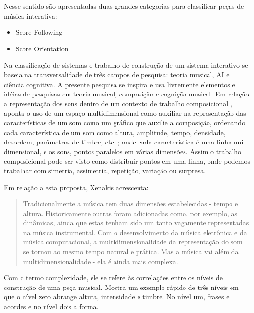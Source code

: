 \documentclass[draft]{ppgmus}
\begin{document}
Nesse sentido são apresentadas duas grandes categorias para classificar peças
de música interativa:

\begin{itemize}
 \item Score Following
  \item Score Orientation
\end{itemize}








Na classificação de sistemas \cite{rowe93:interactive} o trabalho de construção de um sistema interativo se
baseia na transversalidade de  três campos de pesquisa: teoria
musical, AI e ciência cognitiva. A presente pesquisa se inspira e usa
livremente elementos e idéias de pesquisas em teoria musical,
composição e cognição musical. Em relação a representação dos sons
dentro de um contexto de trabalho composicional \cite{xenakis96:determinacy}, aponta o
uso de um espaço multidimensional como auxiliar na representação das
características de um som como um gráfico que auxilie a composição,
ordenando cada característica de um som  como altura, amplitude,
tempo, densidade, desordem, parâmetros de timbre, etc..; onde cada
característica é uma linha uni-dimensional, e os sons, pontos
paralelos em várias dimensões. Assim o trabalho composicional pode ser
visto como distribuir pontos em uma linha, onde podemos trabalhar com
simetria, assimetria, repetição, variação ou surpresa.

Em relação a esta proposta, Xenakis acrescenta: 

\begin{quote}
Tradicionalmente a música tem duas dimensões estabelecidas - tempo e
altura. Historicamente outras foram adicionadas como, por exemplo, as
dinâmicas, ainda que estas tenham sido um tanto vagamente
representadas na música instrumental. Com o desenvolvimento da música
eletrônica e da música computacional, a multidimensionalidade da
representação do som se tornou ao mesmo tempo natural e prática. Mas a
música vai além da multidimensionalidade - ela é ainda mais complexa. \cite{xenakis96:determinacy}
  
\end{quote} 

Com o termo complexidade, ele se refere às correlações entre os níveis
de construção de uma peça musical. Mostra um exemplo rápido de três
níveis em que o nível zero abrange altura, intensidade e timbre. No
nível um, frases e acordes e no nível dois a forma.
\end{document}
